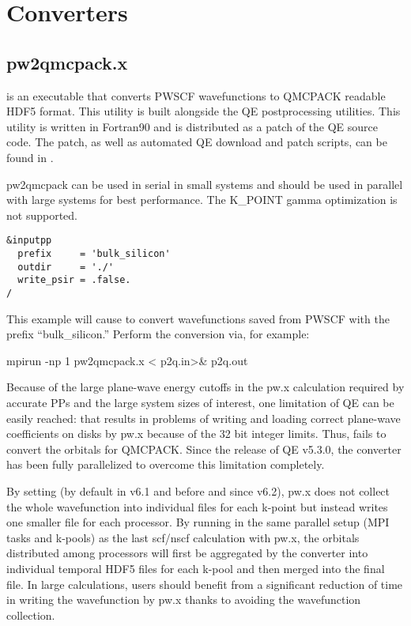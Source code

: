 \section{Converters} 
    
\subsection{pw2qmcpack.x}\label{sec:pw2qmcpack}
 is an executable that converts PWSCF wavefunctions to QMCPACK readable 
HDF5 format.  This utility is built alongside the QE postprocessing utilities.
This utility is written in Fortran90 and is distributed as a patch of the QE 
source code.  The patch, as well as automated QE download and patch scripts, can be found in 
.

pw2qmcpack can be used in serial in small systems and should be used in parallel with large systems for best performance. The K\_POINT gamma optimization is not supported.

\begin{lstlisting}[style=ESPRESSO,caption={Sample \ishell{pw2qmcpack.x} input file \ishell{p2q.in}}]
&inputpp
  prefix     = 'bulk_silicon'
  outdir     = './'
  write_psir = .false.
/
\end{lstlisting}

This example will cause  to convert wavefunctions saved from PWSCF with the prefix ``bulk\_silicon.'' Perform the conversion via, for example:

\begin{shade}
mpirun -np 1 pw2qmcpack.x < p2q.in>& p2q.out
\end{shade}

Because of the large plane-wave energy cutoffs in the pw.x calculation required by accurate PPs and the large system sizes of interest, one limitation of QE can be easily reached:
that  results in problems of writing and loading correct plane-wave coefficients on disks by pw.x because of the 32 bit integer limits. Thus,  fails to convert the orbitals for QMCPACK. Since the release of QE v5.3.0, the converter has been fully parallelized to overcome this limitation completely.

By setting  (by default  in v6.1 and before and  since v6.2), pw.x does not collect the whole wavefunction into individual files for each k-point but instead writes one smaller file for each processor.
By running  in the same parallel setup (MPI tasks and k-pools) as the last scf/nscf calculation with pw.x,
the orbitals distributed among processors will first be aggregated by the converter into individual temporal HDF5 files for each k-pool and then merged into the final file.
In large calculations, users should benefit from a significant reduction of time in writing the wavefunction by pw.x thanks to avoiding the wavefunction collection.

